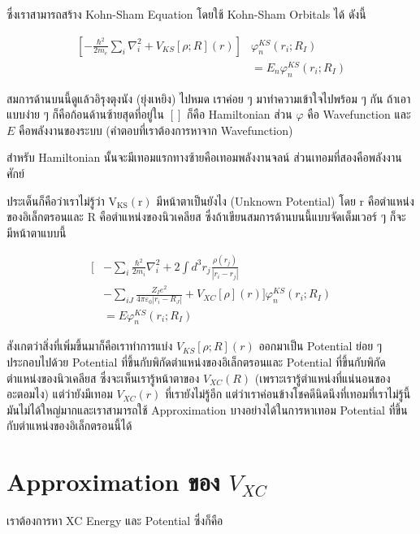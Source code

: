 \noindent ซึ่งเราสามารถสร้าง Kohn-Sham Equation โดยใช้ Kohn-Sham Orbitals ได้ ดังนี้

\begin{align}
    \left[-\frac{\hbar^2}{2 m_e} \sum_i \nabla_i^2
        + V_{K S}[\rho ; R](r)\right] &
    \varphi_n^{K S}\left(r_i ; R_I\right) \nonumber \\
    &= E_n \varphi_n^{K S}\left(r_i ; R_I\right)
\end{align}

\noindent สมการด้านบนนี้ดูแล้วอิรุงตุงนัง (ยุ่งเหยิง) ไปหมด เราค่อย ๆ มาทำความเข้าใจไปพร้อม ๆ กัน ถ้าเอาแบบง่าย ๆ
ก็คือก้อนด้านซ้ายสุดที่อยู่ใน $[ ]$ ก็คือ Hamiltonian ส่วน $\varphi$ คือ Wavefunction และ $E$
คือพลังงานของระบบ (คำตอบที่เราต้องการหาจาก Wavefunction)

สำหรับ Hamiltonian นั้นจะมีเทอมแรกทางซ้ายคือเทอมพลังงานจลน์ ส่วนเทอมที่สองคือพลังงานศักย์

ประเด็นก็คือว่าเราไม่รู้ว่า $\mathrm{V}_{\mathrm{KS}}(\mathrm{r})$ มีหน้าตาเป็นยังไง (Unknown Potential)
โดย $\mathrm{r}$ คือตำแหน่งของอิเล็กตรอนและ $\mathrm{R}$ คือตำแหน่งของนิวเคลียส
ซึ่งถ้าเขียนสมการด้านบนนี้แบบจัดเต็มเวอร์ ๆ ก็จะมีหน้าตาแบบนี้

\begin{align}
    \biggl[ & -\sum_i \frac{\hbar^2}{2 m_i} \nabla_i^2+2 \int d^3 r_j
        \frac{\rho\left(r_j\right)}{\left|r_i-r_j\right|} \nonumber \\
        & -\sum_{i J} \frac{Z_I e^2}{4 \pi \varepsilon_0\left|r_i-R_J\right|}  
        + V_{X C}[\rho](r) \biggr] \varphi_n^{K S}\left(r_i ; R_I\right) \nonumber \\
    & = E \varphi_n^{K S}\left(r_i ; R_I\right)
\end{align}

สังเกตว่าสิ่งที่เพิ่มขึ้นมาก็คือเราทำการแบ่ง $V_{K S}[\rho ; R](r)$ ออกมาเป็น Potential ย่อย ๆ
ประกอบไปด้วย Potential ที่ขึ้นกับพิกัดตำแหน่งของอิเล็กตรอนและ Potential ที่ขึ้นกับพิกัดตำแหน่งของนิวเคลียส 
ซึ่งจะเห็นเรารู้หน้าตาของ $V_{X C}(R)$ (เพราะเรารู้ตำแหน่งที่แน่นอนของอะตอมไง) แต่ว่ายังมีเทอม $V_{X C}(r)$ 
ที่เรายังไม่รู้อีก แต่ว่าเราค่อนข้างโชคดีนิดนึงที่เทอมที่เราไม่รู้นี้มันไม่ได้ใหญ่มากและเราสามารถใช้ Approximation 
บางอย่างได้ในการหาเทอม Potential ที่ขึ้นกับตำแหน่งของอิเล็กตรอนนี้ได้

\section{Approximation ของ $V_{X C}$}

เราต้องการหา XC Energy และ Potential ซึ่งก็คือ

